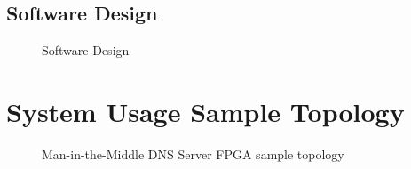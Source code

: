 \documentclass[a4paper]{report}
\begin{document}
\subsection{Software Design}

\begin{figure}[h!]
  \caption{Software Design}
\end{figure}

\section{System Usage Sample Topology}

\begin{figure}[h!]
  \caption{Man-in-the-Middle DNS Server FPGA sample topology}
\end{figure}
\end{document}
